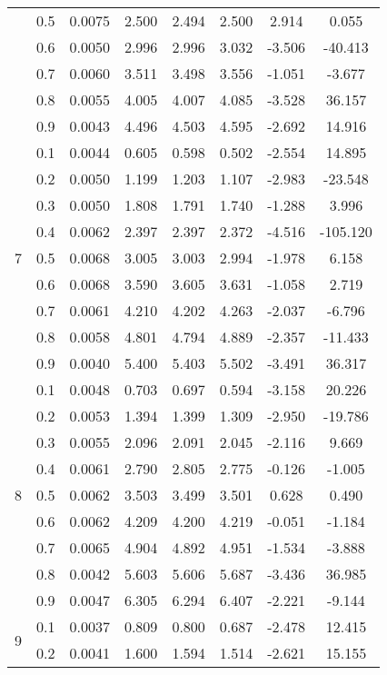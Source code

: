 \documentclass[11pt,a4paper]{report}
\begin{document}
\begin{longtable}{ | c | c || c | c | c | c | c | c | }
 & 0.5 & 0.0075 & 2.500 & 2.494 & 2.500 & 2.914 & 0.055 \\
 & 0.6 & 0.0050 & 2.996 & 2.996 & 3.032 & -3.506 & -40.413 \\
 & 0.7 & 0.0060 & 3.511 & 3.498 & 3.556 & -1.051 & -3.677 \\
 & 0.8 & 0.0055 & 4.005 & 4.007 & 4.085 & -3.528 & 36.157 \\
 & 0.9 & 0.0043 & 4.496 & 4.503 & 4.595 & -2.692 & 14.916 \\
 \hline
\multirow{9}{*}{7} & 0.1 & 0.0044 & 0.605 & 0.598 & 0.502 & -2.554 & 14.895 \\
 & 0.2 & 0.0050 & 1.199 & 1.203 & 1.107 & -2.983 & -23.548 \\
 & 0.3 & 0.0050 & 1.808 & 1.791 & 1.740 & -1.288 & 3.996 \\
 & 0.4 & 0.0062 & 2.397 & 2.397 & 2.372 & -4.516 & -105.120 \\
 & 0.5 & 0.0068 & 3.005 & 3.003 & 2.994 & -1.978 & 6.158 \\
 & 0.6 & 0.0068 & 3.590 & 3.605 & 3.631 & -1.058 & 2.719 \\
 & 0.7 & 0.0061 & 4.210 & 4.202 & 4.263 & -2.037 & -6.796 \\
 & 0.8 & 0.0058 & 4.801 & 4.794 & 4.889 & -2.357 & -11.433 \\
 & 0.9 & 0.0040 & 5.400 & 5.403 & 5.502 & -3.491 & 36.317 \\
 \hline
\multirow{9}{*}{8} & 0.1 & 0.0048 & 0.703 & 0.697 & 0.594 & -3.158 & 20.226 \\
 & 0.2 & 0.0053 & 1.394 & 1.399 & 1.309 & -2.950 & -19.786 \\
 & 0.3 & 0.0055 & 2.096 & 2.091 & 2.045 & -2.116 & 9.669 \\
 & 0.4 & 0.0061 & 2.790 & 2.805 & 2.775 & -0.126 & -1.005 \\
 & 0.5 & 0.0062 & 3.503 & 3.499 & 3.501 & 0.628 & 0.490 \\
 & 0.6 & 0.0062 & 4.209 & 4.200 & 4.219 & -0.051 & -1.184 \\
 & 0.7 & 0.0065 & 4.904 & 4.892 & 4.951 & -1.534 & -3.888 \\
 & 0.8 & 0.0042 & 5.603 & 5.606 & 5.687 & -3.436 & 36.985 \\
 & 0.9 & 0.0047 & 6.305 & 6.294 & 6.407 & -2.221 & -9.144 \\
 \hline
\multirow{9}{*}{9} & 0.1 & 0.0037 & 0.809 & 0.800 & 0.687 & -2.478 & 12.415 \\
 & 0.2 & 0.0041 & 1.600 & 1.594 & 1.514 & -2.621 & 15.155 \\

\end{longtable}
\end{document}
